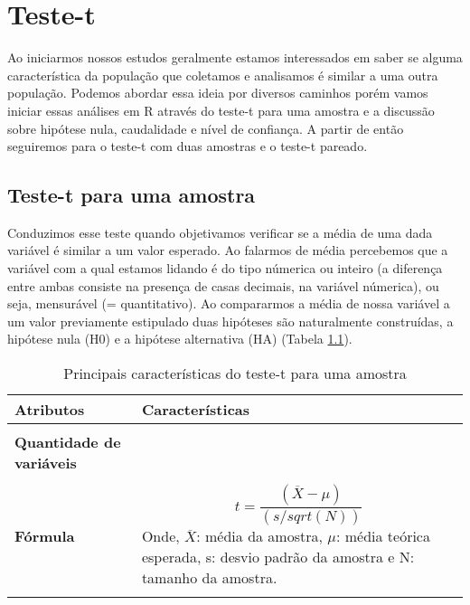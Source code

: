 \documentclass[14pt,titlepage, oneside, openany, a4paper]{book}
\begin{document}
\hypertarget{teste-t}{%
\chapter{Teste-t}\label{teste-t}}

Ao iniciarmos nossos estudos geralmente estamos interessados em saber se alguma característica da população que coletamos e analisamos é similar a uma outra população. Podemos abordar essa ideia por diversos caminhos porém vamos iniciar essas análises em R através do teste-t para uma amostra e a discussão sobre hipótese nula, caudalidade e nível de confiança. A partir de então seguiremos para o teste-t com duas amostras e o teste-t pareado.

\hypertarget{teste-t-para-uma-amostra}{%
\section{Teste-t para uma amostra}\label{teste-t-para-uma-amostra}}

Conduzimos esse teste quando objetivamos verificar se a média de uma dada variável é similar a um valor esperado. Ao falarmos de média percebemos que a variável com a qual estamos lidando é do tipo númerica ou inteiro (a diferença entre ambas consiste na presença de casas decimais, na variável númerica), ou seja, mensurável (= quantitativo). Ao compararmos a média de nossa variável a um valor previamente estipulado duas hipóteses são naturalmente construídas, a hipótese nula (H0) e a hipótese alternativa (HA) (Tabela \ref{tab:tab1t}).

\begin{table}

\caption{\label{tab:tab1t}Principais características do teste-t para uma amostra}
\centering
\begin{tabular}[c]{>{\raggedright\arraybackslash}p{10em}>{\raggedright\arraybackslash}p{30em}}
\toprule
Atributos & Características\\
\midrule
\textbf{\cellcolor{gray!6}{Tipo de variável}} & \cellcolor{gray!6}{Quantitativa}\\
\textbf{Quantidade de variáveis} & 1\\
\textbf{\cellcolor{gray!6}{Hipótese nula}} & \cellcolor{gray!6}{A média da variável é similar ao valor previamente estipulado}\\
\textbf{Fórmula} & $$t=\frac{(\overline{X}-\mu)}{(s/sqrt(N))}$$ Onde, $\overline{X}$: média da amostra, $\mu$: média teórica esperada, s: desvio padrão da amostra e N: tamanho da amostra.\\
\textbf{\cellcolor{gray!6}{Observação}} & \cellcolor{gray!6}{Não há a necessidade de post-hoc nem expressa-la graficamente}\\
\bottomrule
\end{tabular}
\end{table}
\end{document}
